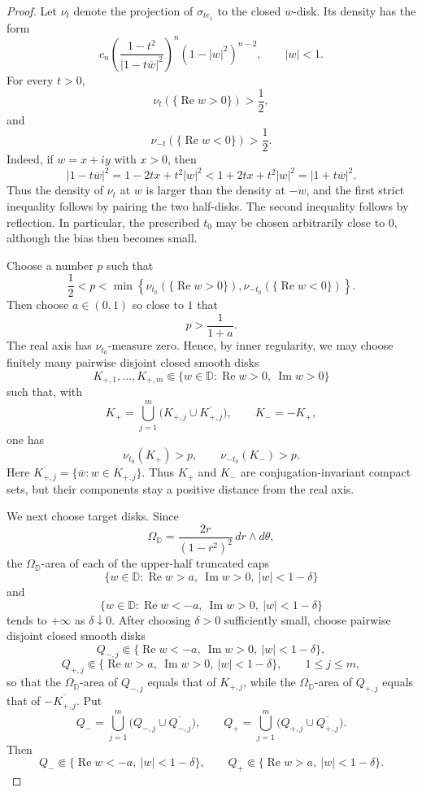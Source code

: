 \documentclass[11pt]{article}
\theoremstyle{definition}
\theoremstyle{remark}
\theoremstyle{definition}
\newcommand{\D}{\mathbb D}
\begin{document}
\begin{proof}
Let \(\nu_t\) denote the projection of \(\sigma_{te_1}\) to the closed
\(w\)-disk.  Its density has the form
\[
        c_n
        \left(
        \frac{1-t^2}{|1-t\overline w|^2}
        \right)^n
        (1-|w|^2)^{n-2},
        \qquad |w|<1.
\]
For every \(t>0\),
\[
        \nu_t(\{\operatorname{Re}w>0\})>\frac12,
\]
and
\[
        \nu_{-t}(\{\operatorname{Re}w<0\})>\frac12.
\]
Indeed, if \(w=x+iy\) with \(x>0\), then
\[
        |1-t\overline w|^2
        =
        1-2tx+t^2|w|^2
        <
        1+2tx+t^2|w|^2
        =
        |1+t\overline w|^2.
\]
Thus the density of \(\nu_t\) at \(w\) is larger than the density at \(-w\),
and the first strict inequality follows by pairing the two half-disks.  The
second inequality follows by reflection.  In particular, the prescribed
\(t_0\) may be chosen arbitrarily close to \(0\), although the bias then becomes
small.

Choose a number \(p\) such that
\[
        \frac12<p<
        \min\left\{
        \nu_{t_0}(\{\operatorname{Re}w>0\}),
        \nu_{-t_0}(\{\operatorname{Re}w<0\})
        \right\}.
\]
Then choose \(a\in(0,1)\) so close to \(1\) that
\[
        p>\frac1{1+a}.
\]
The real axis has \(\nu_{t_0}\)-measure zero.  Hence, by inner regularity,
we may choose finitely many pairwise disjoint closed smooth disks
\[
        K_{+,1},\ldots,K_{+,m}
        \Subset
        \{w\in\D:\operatorname{Re}w>0,\ \operatorname{Im}w>0\}
\]
such that, with
\[
        K_+
        =
        \bigcup_{j=1}^m
        \bigl(K_{+,j}\cup\overline{K_{+,j}}\bigr),
        \qquad
        K_-=-K_+,
\]
one has
\[
        \nu_{t_0}(K_+)>p,
        \qquad
        \nu_{-t_0}(K_-)>p.
\]
Here \(\overline{K_{+,j}}=\{\overline w:w\in K_{+,j}\}\).  Thus
\(K_+\) and \(K_-\) are conjugation-invariant compact sets, but their
components stay a positive distance from the real axis.

We next choose target disks.  Since
\[
        \Omega_{\D}
        =
        \frac{2r}{(1-r^2)^2}\,dr\wedge d\theta,
\]
the \(\Omega_{\D}\)-area of each of the upper-half truncated caps
\[
        \{w\in\D:\operatorname{Re}w>a,\ \operatorname{Im}w>0,
        \ |w|<1-\delta\}
\]
and
\[
        \{w\in\D:\operatorname{Re}w<-a,\ \operatorname{Im}w>0,
        \ |w|<1-\delta\}
\]
tends to \(+\infty\) as \(\delta\downarrow0\).  After choosing
\(\delta>0\) sufficiently small, choose pairwise disjoint closed smooth disks
\[
        Q_{-,j}
        \Subset
        \{\operatorname{Re}w<-a,\ \operatorname{Im}w>0,
        \ |w|<1-\delta\},
\]
\[
        Q_{+,j}
        \Subset
        \{\operatorname{Re}w>a,\ \operatorname{Im}w>0,
        \ |w|<1-\delta\},
        \qquad 1\le j\le m,
\]
so that the \(\Omega_{\D}\)-area of \(Q_{-,j}\) equals that of
\(K_{+,j}\), while the \(\Omega_{\D}\)-area of \(Q_{+,j}\) equals that of
\(-\overline{K_{+,j}}\).  Put
\[
        Q_-
        =
        \bigcup_{j=1}^m
        \bigl(Q_{-,j}\cup\overline{Q_{-,j}}\bigr),
        \qquad
        Q_+
        =
        \bigcup_{j=1}^m
        \bigl(Q_{+,j}\cup\overline{Q_{+,j}}\bigr).
\]
Then
\[
        Q_-\Subset\{\operatorname{Re}w<-a,\ |w|<1-\delta\},
        \qquad
        Q_+\Subset\{\operatorname{Re}w>a,\ |w|<1-\delta\}.
\]


\end{proof}
\end{document}
